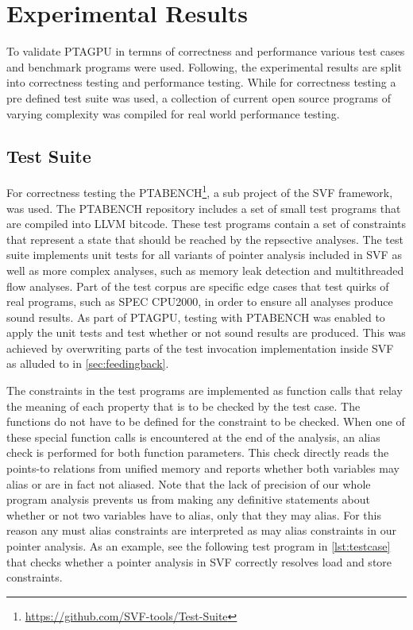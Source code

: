 \section{Experimental Results}
To validate PTAGPU in termns of correctness and performance various test cases and benchmark programs were used.
Following, the experimental results are split into correctness testing and performance testing.
While for correctness testing a pre defined test suite was used, a collection of current open source programs of varying complexity was compiled for real world performance testing.

\subsection{Test Suite}\label{sec:testsuite}
For correctness testing the PTABENCH\footnote{\url{https://github.com/SVF-tools/Test-Suite}}, a sub project of the SVF framework, was used.
The PTABENCH repository includes a set of small test programs that are compiled into LLVM bitcode. These test programs contain a set of constraints that represent a state that should be reached by the repsective analyses.
The test suite implements unit tests for all variants of pointer analysis included in SVF as well as more complex analyses, such as memory leak detection and multithreaded flow analyses. 
Part of the test corpus are specific edge cases that test quirks of real programs, such as SPEC CPU2000, in order to ensure all analyses produce sound results.
As part of PTAGPU, testing with PTABENCH was enabled to apply the unit tests and test whether or not sound results are produced.
This was achieved by overwriting parts of the test invocation implementation inside SVF as alluded to in \autoref{sec:feedingback}.

The constraints in the test programs are implemented as function calls that relay the meaning of each property that is to be checked by the test case. The functions do not have to be defined for the constraint to be checked.
When one of these special function calls is encountered at the end of the analysis, an alias check is performed for both function parameters.
This check directly reads the points-to relations from unified memory and reports whether both variables may alias or are in fact not aliased.
Note that the lack of precision of our whole program analysis prevents us from making any definitive statements about whether or not two variables have to alias, only that they may alias. For this reason any must alias constraints are interpreted as may alias constraints in our pointer analysis.
As an example, see the following test program in \autoref{lst:testcase} that checks whether a pointer analysis in SVF correctly resolves load and store constraints.

